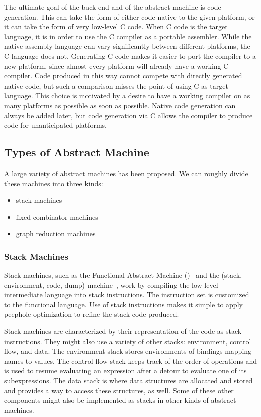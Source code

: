 The ultimate goal of the back end and of the abstract machine is code generation. This can take the form of either code native to the given platform, or it can take the form of very low-level C code. When C code is the target language, it is in order to use the C compiler as a portable assembler. While the native assembly language can vary significantly between different platforms, the C language does not. Generating C code makes it easier to port the compiler to a new platform, since almost every platform will already have a working C compiler. Code produced in this way cannot compete with directly generated native code, but such a comparison misses the point of using C as target language. This choice is motivated by a desire to have a working compiler on as many platforms as possible as soon as possible. Native code generation can always be added later, but code generation via C allows the compiler to produce code for unanticipated platforms.

\subsection{Types of Abstract Machine}
A large variety of abstract machines has been proposed. We can roughly divide these machines into three kinds:
\begin{itemize}
\item
stack machines

\item
fixed combinator machines

\item
graph reduction machines

\end{itemize}

\subsubsection[Stack]{Stack Machines}
Stack machines, such as the Functional Abstract Machine ()~\citep{Cardelli:Compiling:1984} and the  (stack, environment, code, dump) machine~\citep{Landin:The-Mechanical:1964}, work by compiling the low-level intermediate language into stack instructions. The instruction set is customized to the functional language. Use of stack instructions makes it simple to apply peephole optimization to refine the stack code produced.

Stack machines are characterized by their representation of the code as stack instructions. They might also use a variety of other stacks: environment, control flow, and data. The environment stack stores environments of bindings mapping names to values. The control flow stack keeps track of the order of operations and is used to resume evaluating an expression after a detour to evaluate one of its subexpressions. The data stack is where data structures are allocated and stored and provides a way to access these structures, as well. Some of these other components might also be implemented as stacks in other kinds of abstract machines.

